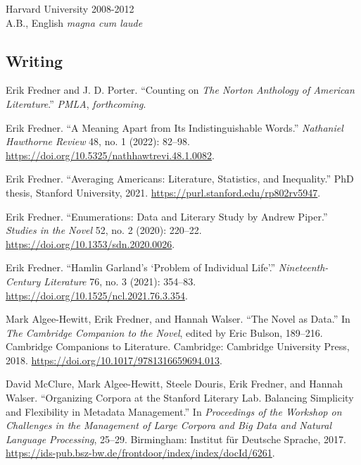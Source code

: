 \documentclass[
  12pt,
  letterpaper,
]{article}
\newlength{\cslhangindent}
\newlength{\cslentryspacingunit} %
\newenvironment{CSLReferences}[2] %
 {%
  \setlength{\parindent}{0pt}
  \ifodd #1
  \let\oldpar\par
  \def\par{\hangindent=\cslhangindent\oldpar}
  \fi
  \setlength{\parskip}{#2\cslentryspacingunit}
 }%
 {}
\begin{document}
Harvard University \hfill 2008-2012\\
\hspace*{0.333em} A.B., English \emph{magna cum laude}

\hypertarget{writing}{%
\subsection{Writing}\label{writing}}
\bigskip
\begin{CSLReferences}{1}{0}

\leavevmode{}%
Erik Fredner and J. D. Porter. {``Counting on {\emph{The Norton
Anthology of American Literature}}.''} \emph{PMLA},
\emph{forthcoming}.

\leavevmode{}%
Erik Fredner. {``A {Meaning Apart} from {Its Indistinguishable
Words}.''} \emph{Nathaniel Hawthorne Review} 48, no. 1 (2022): 82--98.
\url{https://doi.org/10.5325/nathhawtrevi.48.1.0082}.

\leavevmode{}%
Erik Fredner. {``Averaging {Americans}: {Literature}, {Statistics}, and
{Inequality}.''} PhD thesis, Stanford University, 2021.
\url{https://purl.stanford.edu/rp802rv5947}.

\leavevmode{}%
Erik Fredner. {``Enumerations: {Data} and {Literary Study} by {Andrew
Piper}.''} \emph{Studies in the Novel} 52, no. 2 (2020): 220--22.
\url{https://doi.org/10.1353/sdn.2020.0026}.

\leavevmode{}%
Erik Fredner. {``Hamlin {Garland}'s {`{Problem} of {Individual Life}'}.''}
\emph{Nineteenth-Century Literature} 76, no. 3 (2021): 354--83.
\url{https://doi.org/10.1525/ncl.2021.76.3.354}.

\leavevmode{}%
Mark Algee-Hewitt, Erik Fredner, and Hannah Walser. {``The {Novel} as
{Data}.''} In \emph{The {Cambridge Companion} to the {Novel}}, edited by
Eric Bulson, 189--216. Cambridge {Companions} to {Literature}.
{Cambridge}: {Cambridge University Press}, 2018.
\url{https://doi.org/10.1017/9781316659694.013}.

\newpage

\leavevmode{}%
David McClure, Mark Algee-Hewitt, Steele Douris, Erik Fredner, and
Hannah Walser. {``Organizing Corpora at the {Stanford Literary Lab}.
{Balancing} Simplicity and Flexibility in Metadata Management.''} In
\emph{Proceedings of the {Workshop} on {Challenges} in the {Management}
of {Large Corpora} and {Big Data} and {Natural Language Processing}},
25--29. {Birmingham}: {Institut für Deutsche Sprache}, 2017.
\url{https://ids-pub.bsz-bw.de/frontdoor/index/index/docId/6261}.

\end{CSLReferences}
\end{document}
